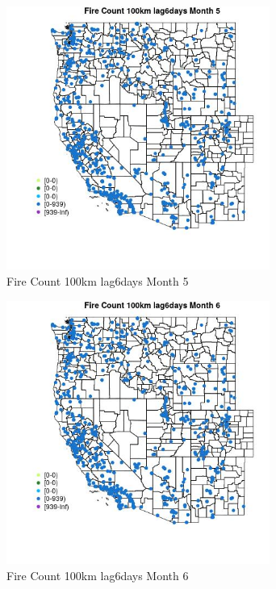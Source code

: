 \begin{figure} 
\centering  
\includegraphics[width=0.77\textwidth]{Code_Outputs/Report_ML_input_PM25_Step4_part_e_de_duplicated_aves_compiled_2019-05-21wNAs_MapObsMo5Fire_Count_100km_lag6days.jpg} 
\caption{\label{fig:Report_ML_input_PM25_Step4_part_e_de_duplicated_aves_compiled_2019-05-21wNAsMapObsMo5Fire_Count_100km_lag6days}Fire Count 100km lag6days Month 5} 
\end{figure} 
 

\clearpage 

\begin{figure} 
\centering  
\includegraphics[width=0.77\textwidth]{Code_Outputs/Report_ML_input_PM25_Step4_part_e_de_duplicated_aves_compiled_2019-05-21wNAs_MapObsMo6Fire_Count_100km_lag6days.jpg} 
\caption{\label{fig:Report_ML_input_PM25_Step4_part_e_de_duplicated_aves_compiled_2019-05-21wNAsMapObsMo6Fire_Count_100km_lag6days}Fire Count 100km lag6days Month 6} 
\end{figure} 
 

